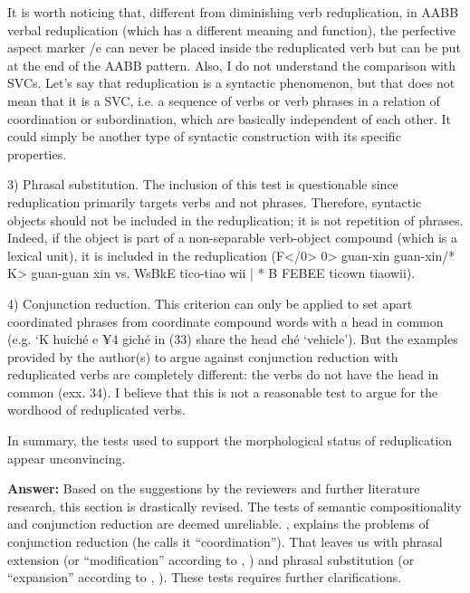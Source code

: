 \documentclass[fleqn,twoside]{article}
\begin{document}
\begin{enumerate}
It is worth noticing that, different from diminishing verb reduplication, in AABB verbal reduplication (which has a different meaning and function), the perfective aspect marker /e can never be placed inside the reduplicated verb but can be put at the end of the AABB pattern. Also, I do not understand the comparison with SVCs. Let’s say that reduplication is a syntactic phenomenon, but that does not mean that it is a SVC, i.e. a sequence of verbs or verb phrases in a relation of coordination or subordination, which are basically independent of each other. It could simply be another type of syntactic construction with its specific properties.

3) Phrasal substitution. The inclusion of this test is questionable since reduplication primarily targets verbs and not phrases. Therefore, syntactic objects should not be included in the reduplication; it is not repetition of phrases. Indeed, if the object is part of a non-separable verb-object compound (which is a lexical unit), it is included in the reduplication (F</0> 0> guan-xin guan-xin/*  K> guan-guan xin vs. WsBkE tico-tiao wii | * B FEBEE ticown tiaowii).

4) Conjunction reduction. This criterion can only be applied to set apart coordinated phrases from coordinate compound words with a head in common (e.g. ‘K huiché e ¥4 giché in (33) share the head  ché ‘vehicle’). But the examples provided by the author(s) to argue against conjunction reduction with reduplicated verbs are completely different: the verbs do not have the head in common (exx. 34). I believe that this is not a reasonable test to argue for the wordhood of reduplicated verbs.

In summary, the tests used to support the morphological status of reduplication appear
unconvincing.


\textbf{Answer:}\label{morph}
Based on the suggestions by the reviewers and further literature research, this section is drastically revised.
The tests of semantic compositionality and conjunction reduction are deemed unreliable.
\citet[37--38]{Dai1992}, \citeyear[120--122]{Dai1998} explains the problems of conjunction reduction (he calls it ``coordination'').
That leaves us with phrasal extension (or ``modification'' according to \citealt[32]{Dai1992}, \citeyear[117]{Dai1998})
and phrasal substitution (or ``expansion'' according to \citealt[33]{Dai1992}, \citeyear[117--120]{Dai1998}).
These tests requires further clarifications.


\end{enumerate}
\end{document}

